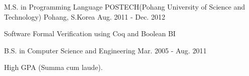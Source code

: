 

\begin{cventries}

  \cventry
    {M.S. in Programming Language} %
    {POSTECH(Pohang University of Science and Technology)} %
    {Pohang, S.Korea} %
    {Aug. 2011 - Dec. 2012} %
    {
      \begin{cvitems} %
        \item {Software Formal Verification using Coq and Boolean BI}
      \end{cvitems}
    }

  \cventry
    {B.S. in Computer Science and Engineering} %
    {} %
    {} %
    {Mar. 2005 - Aug. 2011} %
    {
      \begin{cvitems} %
        \item {High GPA (Summa cum laude).}
      \end{cvitems}
    }

\end{cventries}
